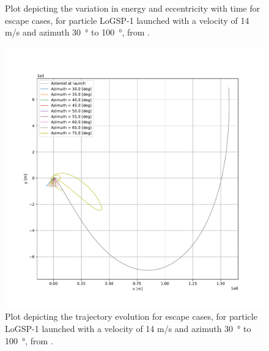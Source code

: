 \documentclass[print]{tudelft-report}
\begin{document}
\begin{appendices}
\begin{figure}[htb]
    \caption{Plot depicting the variation in energy and eccentricity with time for escape cases, for particle LoGSP-1 launched with a velocity of 14 m/s and azimuth \SI{30}{\degree} to \SI{100}{\degree}, from \protect{}.}
    \label{fig:leadingEdge_logsp1_escape_energy_ecc_14ms_solar225}
    \end{figure}
    \FloatBarrier
    \begin{figure}[htb]
    \centering
    \captionsetup{justification=centering}
    \includegraphics[width=\textwidth, height=0.6\textheight, keepaspectratio=true]{Results/Images/leading_edge_perturbations/logsp1_escape_traj_14ms_solarPhase225.pdf}
    \caption{Plot depicting the trajectory evolution for escape cases, for particle LoGSP-1 launched with a velocity of 14 m/s and azimuth \SI{30}{\degree} to \SI{100}{\degree}, from \protect{}.}
    \label{fig:leadingEdge_logsp1_escape_traj_14ms_solar225}
    \end{figure}
    \FloatBarrier
    \begin{figure}[htb]
    \centering
    \captionsetup{justification=centering}

\end{figure}
\end{appendices}
\end{document}
